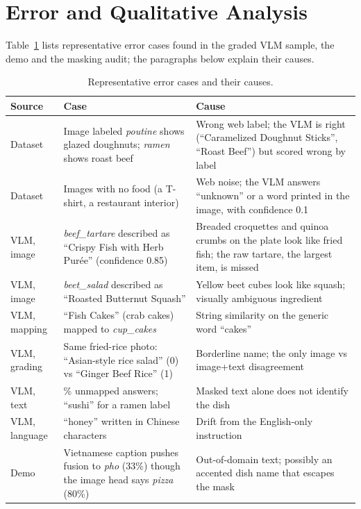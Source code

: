\documentclass[11pt,a4paper]{article}
\begin{document}
\section{Error and Qualitative Analysis}
\label{sec:errors}

Table~\ref{tab:errors} lists representative error cases found in the graded VLM sample, the demo and the masking
audit; the paragraphs below explain their causes.

\begin{table}[!htbp]
\centering
\caption{Representative error cases and their causes.}
\label{tab:errors}
\small
\begin{tabularx}{\linewidth}{l>{\raggedright\arraybackslash}X>{\raggedright\arraybackslash}X}
\toprule
Source & Case & Cause \\
\midrule
Dataset & Image labeled \emph{poutine} shows glazed doughnuts; \emph{ramen} shows roast beef & Wrong web label; the
VLM is right (``Caramelized Doughnut Sticks'', ``Roast Beef'') but scored wrong by label \\
Dataset & Images with no food (a T-shirt, a restaurant interior) & Web noise; the VLM answers ``unknown'' or a word
printed in the image, with confidence 0.1 \\
VLM, image & \emph{beef\_tartare} described as ``Crispy Fish with Herb Pur\'ee'' (confidence 0.85) & Breaded croquettes and
quinoa crumbs on the plate look like fried fish; the raw tartare, the largest item, is missed \\
VLM, image & \emph{beet\_salad} described as ``Roasted Butternut Squash'' & Yellow beet cubes look like squash;
visually ambiguous ingredient \\
VLM, mapping & ``Fish Cakes'' (crab cakes) mapped to \emph{cup\_cakes} & String similarity on the generic word
``cakes'' \\
VLM, grading & Same fried-rice photo: ``Asian-style rice salad'' (0) vs ``Ginger Beef Rice'' (1) & Borderline name;
the only image vs image+text disagreement \\
VLM, text & 79.9\% unmapped answers; ``sushi'' for a ramen label & Masked text alone does not identify the dish \\
VLM, language & ``honey'' written in Chinese characters & Drift from the English-only instruction \\
Demo & Vietnamese caption pushes fusion to \emph{pho} (33\%) though the image head says \emph{pizza} (80\%) &
Out-of-domain text; possibly an accented dish name that escapes the mask \\
\bottomrule
\end{tabularx}
\end{table}
\end{document}
